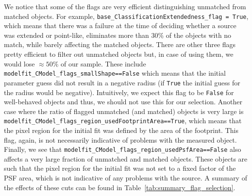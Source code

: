 \documentclass[\docopts]{\docclass}
\begin{document}

We notice that some of the flags are very efficient distinguishing unmatched from matched objects. For example, \texttt{base\_ClassificationExtendedness\_flag = True}, which means that there was a failure at the time of deciding whether a source was extended or point-like, eliminates more than 30\% of the objects with no match, while barely affecting the matched objects. There are other three flags pretty efficient to filter out unmatched objects but, in case of using them, we would lose $\approx 50\%$ of our sample. These include \texttt{modelfit\_CModel\_flags\_smallShape==False} which means that the initial parameter guess did not result in a negative radius (if \texttt{True} the initial guess for the radius would be negative). Intuitively, we expect this flag to be \texttt{False} for well-behaved objects and thus, we should not use this for our selection. Another case where the ratio of flagged unmatched (and matched) objects is very large is \texttt{modelfit\_CModel\_flags\_region\_usedFootprintArea==True}, which means that the pixel region for the initial fit was defined by the area of the footprint. This flag, again, is not necessarily indicative of problems with the measured object. Finally, we see that \texttt{modelfit\_CModel\_flags\_region\_usedPsfArea==False} also affects a very large fraction of unmatched and matched objects. These objects are such that the pixel region for the initial fit was not set to a fixed factor of the PSF area, which is not indicative of any problems with the source. A summary of the effects of these cuts can be found in Table~\ref{tab:summary_flag_selection}.

\end{document}

